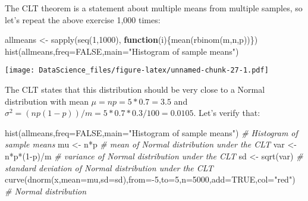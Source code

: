 \documentclass[
]{book}
\newenvironment{Shaded}{\begin{snugshade}}{\end{snugshade}}
\newcommand{\AttributeTok}[1]{\textcolor[rgb]{0.77,0.63,0.00}{#1}}
\newcommand{\CommentTok}[1]{\textcolor[rgb]{0.56,0.35,0.01}{\textit{#1}}}
\newcommand{\ConstantTok}[1]{\textcolor[rgb]{0.00,0.00,0.00}{#1}}
\newcommand{\ControlFlowTok}[1]{\textcolor[rgb]{0.13,0.29,0.53}{\textbf{#1}}}
\newcommand{\DecValTok}[1]{\textcolor[rgb]{0.00,0.00,0.81}{#1}}
\newcommand{\FunctionTok}[1]{\textcolor[rgb]{0.00,0.00,0.00}{#1}}
\newcommand{\NormalTok}[1]{#1}
\newcommand{\OtherTok}[1]{\textcolor[rgb]{0.56,0.35,0.01}{#1}}
\newcommand{\SpecialCharTok}[1]{\textcolor[rgb]{0.00,0.00,0.00}{#1}}
\newcommand{\StringTok}[1]{\textcolor[rgb]{0.31,0.60,0.02}{#1}}
\begin{document}
The CLT theorem is a statement about multiple means from multiple samples, so let's repeat the above exercise 1,000 times:

\begin{Shaded}
\begin{Highlighting}[]
\NormalTok{allmeans }\OtherTok{\textless{}{-}} \FunctionTok{sapply}\NormalTok{(}\FunctionTok{seq}\NormalTok{(}\DecValTok{1}\NormalTok{,}\DecValTok{1000}\NormalTok{), }\ControlFlowTok{function}\NormalTok{(i)\{}\FunctionTok{mean}\NormalTok{(}\FunctionTok{rbinom}\NormalTok{(m,n,p))\})}
\FunctionTok{hist}\NormalTok{(allmeans,}\AttributeTok{freq=}\ConstantTok{FALSE}\NormalTok{,}\AttributeTok{main=}\StringTok{"Histogram of sample means"}\NormalTok{)}
\end{Highlighting}
\end{Shaded}

\texttt{[image: DataScience\_files/figure-latex/unnamed-chunk-27-1.pdf]}

The CLT states that this distribution should be very close to a Normal distribution with mean \(\mu = np = 5*0.7 = 3.5\) and \(\sigma^2 = (np(1-p))/m = 5*0.7*0.3/100 = 0.0105\). Let's verify that:

\begin{Shaded}
\begin{Highlighting}[]
\FunctionTok{hist}\NormalTok{(allmeans,}\AttributeTok{freq=}\ConstantTok{FALSE}\NormalTok{,}\AttributeTok{main=}\StringTok{"Histogram of sample means"}\NormalTok{) }\CommentTok{\# Histogram of sample means}
\NormalTok{mu }\OtherTok{\textless{}{-}}\NormalTok{ n}\SpecialCharTok{*}\NormalTok{p }\CommentTok{\# mean of Normal distribution under the CLT}
\NormalTok{var }\OtherTok{\textless{}{-}}\NormalTok{ n}\SpecialCharTok{*}\NormalTok{p}\SpecialCharTok{*}\NormalTok{(}\DecValTok{1}\SpecialCharTok{{-}}\NormalTok{p)}\SpecialCharTok{/}\NormalTok{m }\CommentTok{\# variance of Normal distribution under the CLT}
\NormalTok{sd }\OtherTok{\textless{}{-}} \FunctionTok{sqrt}\NormalTok{(var) }\CommentTok{\# standard deviation of Normal distribution under the CLT}
\FunctionTok{curve}\NormalTok{(}\FunctionTok{dnorm}\NormalTok{(x,}\AttributeTok{mean=}\NormalTok{mu,}\AttributeTok{sd=}\NormalTok{sd),}\AttributeTok{from=}\SpecialCharTok{{-}}\DecValTok{5}\NormalTok{,}\AttributeTok{to=}\DecValTok{5}\NormalTok{,}\AttributeTok{n=}\DecValTok{5000}\NormalTok{,}\AttributeTok{add=}\ConstantTok{TRUE}\NormalTok{,}\AttributeTok{col=}\StringTok{"red"}\NormalTok{) }\CommentTok{\# Normal distribution}
\end{Highlighting}
\end{Shaded}
\end{document}
